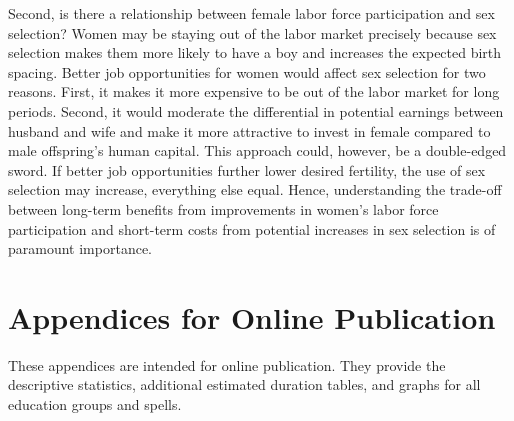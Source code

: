 \documentclass[12pt,letterpaper]{article}
\begin{document}
Second, is there a relationship between female labor force participation
and sex selection? 
Women may be staying out of the labor market precisely because sex selection makes 
them more likely to have a boy and increases the expected birth spacing. 
Better job opportunities for women would affect sex selection for two reasons. 
First, it makes it more expensive to be out of the labor market for long periods. 
Second, it would moderate the differential in potential earnings between husband
and wife and make it more attractive to invest in female compared to
male offspring's human capital. 
This approach could, however, be a double-edged sword. 
If better job opportunities further lower desired fertility, the use of sex selection 
may increase, everything else equal.
Hence, understanding the trade-off between long-term benefits from
improvements in women's labor force participation and short-term costs
from potential increases in sex selection is of paramount importance.





\clearpage

\onehalfspacing






\clearpage
\newpage

\appendix

\renewcommand\thefigure{\thesection.\arabic{figure}}    
\renewcommand\thetable{\thesection.\arabic{table}}    

\section*{Appendices for Online Publication}

These appendices are intended for online publication.
They provide the descriptive statistics, additional
estimated duration tables, and graphs for all 
education groups and spells.
\end{document}
